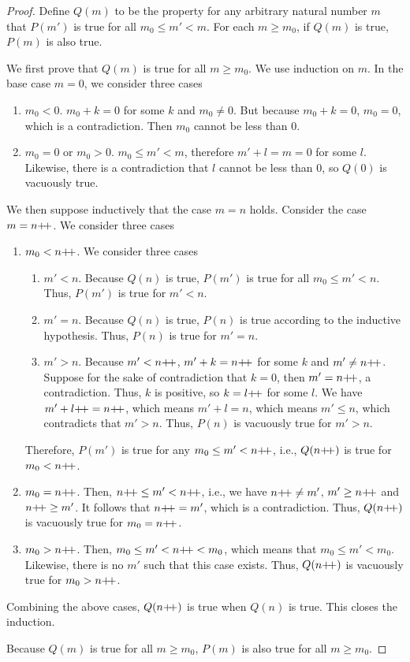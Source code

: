 \begin{proof}
    Define $Q(m)$ to be the property for any arbitrary natural number $m$ that $P(m')$ is true for all $m_0 \leq m' < m$. For each $m \geq m_0$, if $Q(m)$ is true, $P(m)$ is also true.

    We first prove that $Q(m)$ is true for all $m\geq m_0$. We use induction on $m$. In the base case $m=0$, we consider three cases
    \begin{enumerate}[label=(\arabic*)]
        \item $m_0<0$. $m_0+k=0$ for some $k$ and $m_0\neq 0$. But because $m_0+k=0$, $m_0=0$, which is a contradiction. Then $m_0$ cannot be less than $0$.
        \item $m_0=0$ or $m_0>0$. $m_0 \leq m' < m$, therefore $m'+l=m=0$ for some $l$. Likewise, there is a contradiction that $l$ cannot be less than $0$, so $Q(0)$ is vacuously true.
    \end{enumerate}

    We then suppose inductively that the case $m=n$ holds. Consider the case $m=n{+}{\mkern-4mu}{+}$. We consider three cases
    \begin{enumerate}[label=(\arabic*)]
        \item $m_0<n{+}{\mkern-4mu}{+}$. We consider three cases
            \begin{enumerate}[label=(\roman*)]
                \item $m'<n$. Because $Q(n)$ is true, $P(m')$ is true for all $m_0 \leq m' < n$. Thus, $P(m')$ is true for $m'<n$.
                \item $m'=n$. Because $Q(n)$ is true, $P(n)$ is true according to the inductive hypothesis. Thus, $P(n)$ is true for $m'=n$.
                \item $m'>n$. Because $m'<n{+}{\mkern-4mu}{+}$, $m'+k=n{+}{\mkern-4mu}{+}$ for some $k$ and $m'\neq n{+}{\mkern-4mu}{+}$. Suppose for the sake of contradiction that $k=0$, then $m'=n{+}{\mkern-4mu}{+}$, a contradiction. Thus, $k$ is positive, so $k=l{+}{\mkern-4mu}{+}$ for some $l$. We have $m'+l{+}{\mkern-4mu}{+}=n{+}{\mkern-4mu}{+}$, which means $m'+l=n$, which means $m'\leq n$, which contradicts that $m'>n$. Thus, $P(n)$ is vacuously true for $m'>n$.
            \end{enumerate}
            Therefore, $P(m')$ is true for any $m_0 \leq m'<n{+}{\mkern-4mu}{+}$, i.e., $Q(n{+}{\mkern-4mu}{+})$ is true for $m_0<n{+}{\mkern-4mu}{+}$.
        \item $m_0=n{+}{\mkern-4mu}{+}$. Then, $n{+}{\mkern-4mu}{+}\leq m'< n{+}{\mkern-4mu}{+}$, i.e., we have $n{+}{\mkern-4mu}{+} \neq m'$, $m'\geq n{+}{\mkern-4mu}{+}$ and $n{+}{\mkern-4mu}{+} \geq m'$. It follows that $n{+}{\mkern-4mu}{+} = m'$, which is a contradiction. Thus, $Q(n{+}{\mkern-4mu}{+})$ is vacuously true for $m_0=n{+}{\mkern-4mu}{+}$.
        \item $m_0>n{+}{\mkern-4mu}{+}$. Then, $m_0 \leq m' < n{+}{\mkern-4mu}{+} <m_0$, which means that $m_0\leq m' < m_0$. Likewise, there is no $m'$ such that this case exists. Thus, $Q(n{+}{\mkern-4mu}{+})$ is vacuously true for $m_0>n{+}{\mkern-4mu}{+}$.
    \end{enumerate}
    Combining the above cases, $Q(n{+}{\mkern-4mu}{+})$ is true when $Q(n)$ is true. This closes the induction.

    Because $Q(m)$ is true for all $m\geq m_0$, $P(m)$ is also true for all $m\geq m_0$.
\end{proof}


